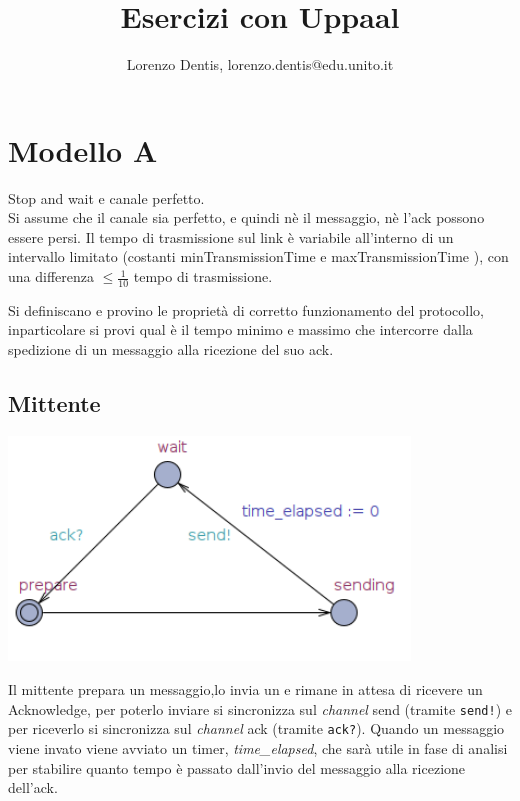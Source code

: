 \documentclass[a4paper]{article}
\newcommand{\channel}{\textit{channel }}
\begin{document}
\author{Lorenzo Dentis, lorenzo.dentis@edu.unito.it}
\title{Esercizi con Uppaal}
\maketitle
\section{Modello A}
Stop and wait e canale perfetto.\\ 
Si assume che il canale sia perfetto, e quindi nè il messaggio, nè l’ack possono essere persi. 
Il tempo di trasmissione sul link è variabile all’interno di un intervallo limitato (costanti minTransmissionTime e maxTransmissionTime ), con una differenza $\leq \frac{1}{10}$ tempo di trasmissione. 

Si definiscano e provino le proprietà di corretto funzionamento del protocollo, inparticolare si provi qual è il tempo minimo e massimo che intercorre dalla spedizione di un messaggio alla ricezione del suo ack.
\subsection{Mittente}
\begin{center}\includegraphics[width=0.8\textwidth]{1_sender.png}\end{center}
Il mittente prepara un messaggio,lo invia un e rimane in attesa di ricevere un Acknowledge, per poterlo inviare si sincronizza sul \channel send (tramite \texttt{send!}) e per riceverlo si sincronizza sul \channel ack (tramite \texttt{ack?}).
Quando un messaggio viene invato viene avviato un timer, \textit{time\_elapsed}, che sarà utile in fase di analisi per stabilire quanto tempo è passato dall'invio del messaggio alla ricezione dell'ack.
\end{document}
